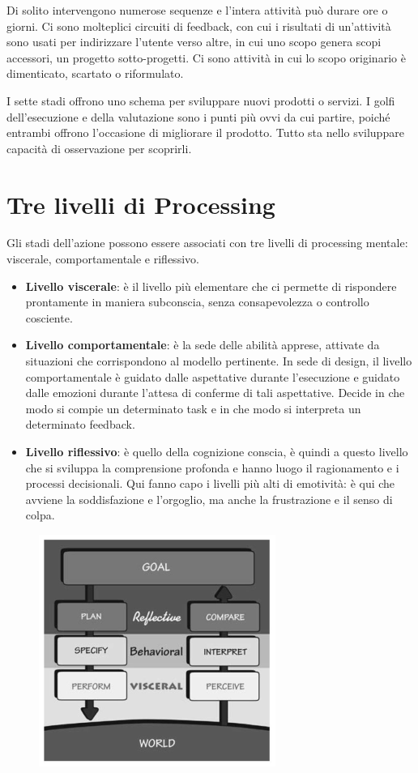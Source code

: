 \documentclass[a4paper,11pt,oneside]{book}
\begin{document}
Di solito intervengono numerose sequenze e l'intera attività può durare ore o giorni. Ci sono molteplici circuiti di feedback, con cui i risultati di un'attività sono usati per indirizzare l'utente verso altre, in cui uno scopo genera scopi accessori, un progetto sotto-progetti. Ci sono attività in cui lo scopo originario è dimenticato, scartato o riformulato.

I sette stadi offrono uno schema per sviluppare nuovi prodotti o servizi. I golfi dell'esecuzione e della valutazione sono i punti più ovvi da cui partire, poiché entrambi offrono l'occasione di migliorare il prodotto. Tutto sta nello sviluppare capacità di osservazione per scoprirli.

\section{Tre livelli di Processing}
Gli stadi dell'azione possono essere associati con tre livelli di processing mentale: viscerale, comportamentale e riflessivo.

\begin{itemize}
	\item \textbf{Livello viscerale}: è il livello più elementare che ci permette di rispondere prontamente in maniera subconscia, senza consapevolezza o controllo cosciente.
	\item \textbf{Livello comportamentale}: è la sede delle abilità apprese, attivate da situazioni che corrispondono al modello pertinente. In sede di design, il livello comportamentale è guidato dalle aspettative durante l'esecuzione e guidato dalle emozioni durante l'attesa di conferme di tali aspettative. Decide in che modo si compie un determinato task e in che modo si interpreta un determinato feedback.
	\item \textbf{Livello riflessivo}: è quello della cognizione conscia, è quindi a questo livello che si sviluppa la comprensione profonda e hanno luogo il ragionamento e i processi decisionali. Qui fanno capo i livelli più alti di emotività: è qui che avviene la soddisfazione e l'orgoglio, ma anche la frustrazione e il senso di colpa.
\end{itemize}

\begin{figure}[!h]
	\centering
	\includegraphics[scale=1]{"immagini/Livelli di Processing"}
\end{figure}
\end{document}
